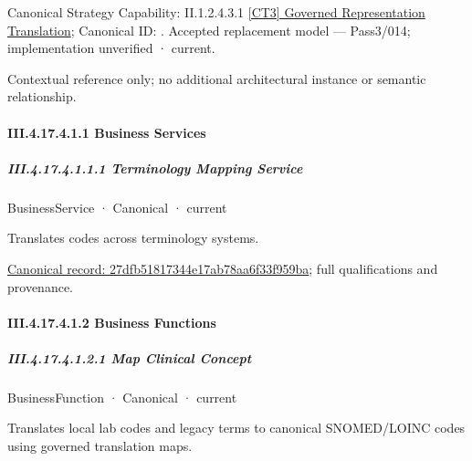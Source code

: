 {\small Canonical Strategy Capability: II.1.2.4.3.1 \hyperref[element:bfaeedaf94c54505bc0616e4653b5767]{[CT3] Governed Representation Translation}; Canonical ID: \texttt{}. Accepted replacement model — Pass3/014; implementation unverified · current.}\par
Contextual reference only; no additional architectural instance or semantic relationship.\par
\paragraph*{III.4.17.4.1.1 Business Services}
\label{navigation:III.4.17.4.1.1}

\subparagraph*{III.4.17.4.1.1.1 Terminology Mapping Service}
\label{navigation:III.4.17.4.1.1.1}

\label{element:27dfb51817344e17ab78aa6f33f959ba}
{\small BusinessService · Canonical · current}\par

Translates codes across terminology systems.


{\footnotesize \href{../../../../continuum/business/business-service/27dfb51817344e17ab78aa6f33f959ba.md}{Canonical record: 27dfb51817344e17ab78aa6f33f959ba}; full qualifications and provenance.}\par
\paragraph*{III.4.17.4.1.2 Business Functions}
\label{navigation:III.4.17.4.1.2}

\subparagraph*{III.4.17.4.1.2.1 Map Clinical Concept}
\label{navigation:III.4.17.4.1.2.1}

\label{element:9549208d56cd47d8a9ba4e586323ef3b}
{\small BusinessFunction · Canonical · current}\par

Translates local lab codes and legacy terms to canonical SNOMED/LOINC codes using governed translation maps.


